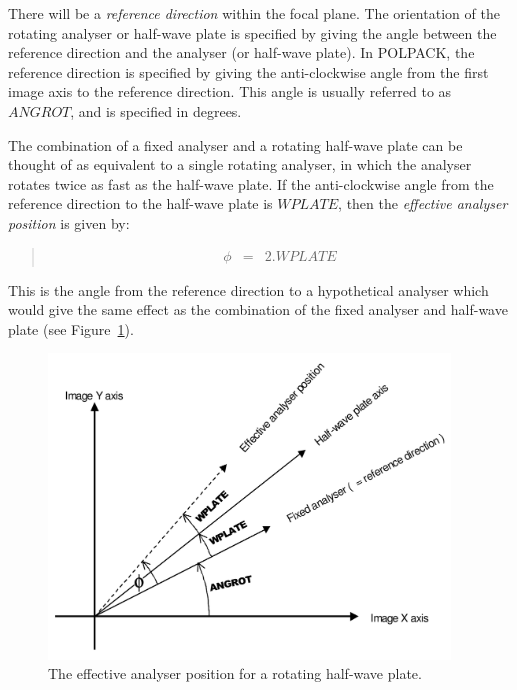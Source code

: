 \documentclass[twoside,11pt]{starlink}
\newenvironment{myquote}{\begin{quote}\begin{small}}{\end{small}\end{quote}}
\begin{document}
There will be a \emph{reference direction} within the focal plane. The
orientation of the rotating analyser or half-wave plate is specified by
giving the
angle between the reference direction and the analyser (or half-wave
plate). In POLPACK, the reference direction is specified by giving the
anti-clockwise angle from the first image axis to the reference
direction. This angle is usually referred to as $ANGROT$, and is specified in
degrees.

The combination of a fixed analyser and a rotating half-wave plate can be
thought of as equivalent to a single rotating analyser, in which the
analyser rotates twice as fast as the half-wave plate. If the
anti-clockwise angle from the reference direction to the half-wave plate
is $WPLATE$, then the \emph{effective analyser position} is given by:

\begin{myquote}
\begin{eqnarray*}
  \phi & = & 2.WPLATE
\end{eqnarray*}
\end{myquote}

This is the angle from the reference direction to a hypothetical analyser
which would give the same effect as the combination of the fixed analyser
and half-wave plate (see Figure~\ref{fig:effan}).

  \begin{figure}[htpb]
  \begin{center}
  \includegraphics[clip,width=0.95\textwidth]{sun223_figures/effan}
  \vspace{4mm}
  \caption{The effective analyser position for a rotating half-wave plate.}
  \label{fig:effan}
  \end{center}
  \end{figure}
\end{document}
